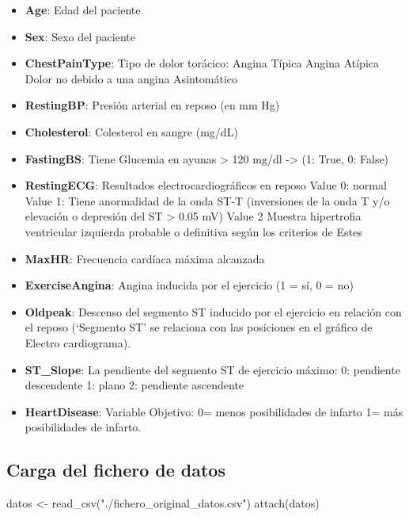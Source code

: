 \documentclass[
]{article}
\newenvironment{Shaded}{\begin{snugshade}}{\end{snugshade}}
\newcommand{\FunctionTok}[1]{\textcolor[rgb]{0.94,0.94,0.56}{#1}}
\newcommand{\NormalTok}[1]{\textcolor[rgb]{0.80,0.80,0.80}{#1}}
\newcommand{\OtherTok}[1]{\textcolor[rgb]{0.94,0.94,0.56}{#1}}
\newcommand{\StringTok}[1]{\textcolor[rgb]{0.80,0.58,0.58}{#1}}
\providecommand{\tightlist}{%
  \setlength{\itemsep}{0pt}\setlength{\parskip}{0pt}}
\begin{document}
\begin{itemize}
\tightlist
\item
  \textbf{Age}: Edad del paciente
\item
  \textbf{Sex}: Sexo del paciente
\item
  \textbf{ChestPainType}: Tipo de dolor torácico: Angina Típica Angina
  Atípica Dolor no debido a una angina Asintomático
\item
  \textbf{RestingBP}: Presión arterial en reposo (en mm Hg)
\item
  \textbf{Cholesterol}: Colesterol en sangre (mg/dL)
\item
  \textbf{FastingBS}: Tiene Glucemia en ayunas \textgreater{} 120 mg/dl
  -\textgreater{} (1: True, 0: False)
\item
  \textbf{RestingECG}: Resultados electrocardiográficos en reposo Value
  0: normal Value 1: Tiene anormalidad de la onda ST-T (inversiones de
  la onda T y/o elevación o depresión del ST \textgreater{} 0.05 mV)
  Value 2 Muestra hipertrofia ventricular izquierda probable o
  definitiva según los criterios de Estes
\item
  \textbf{MaxHR}: Frecuencia cardíaca máxima alcanzada
\item
  \textbf{ExerciseAngina}: Angina inducida por el ejercicio (1 = sí, 0 =
  no)
\item
  \textbf{Oldpeak}: Descenso del segmento ST inducido por el ejercicio
  en relación con el reposo (`Segmento ST' se relaciona con las
  posiciones en el gráfico de Electro cardiograma).
\item
  \textbf{ST\_Slope}: La pendiente del segmento ST de ejercicio máximo:
  0: pendiente descendente 1: plano 2: pendiente ascendente
\item
  \textbf{HeartDisease}: Variable Objetivo: 0= menos posibilidades de
  infarto 1= más posibilidades de infarto.
\end{itemize}

\hypertarget{carga-del-fichero-de-datos}{%
\subsection{Carga del fichero de
datos}\label{carga-del-fichero-de-datos}}

\begin{Shaded}
\begin{Highlighting}[]
\NormalTok{datos }\OtherTok{\textless{}{-}} \FunctionTok{read\_csv}\NormalTok{(}\StringTok{"./fichero\_original\_datos.csv"}\NormalTok{)}
\FunctionTok{attach}\NormalTok{(datos)}
\end{Highlighting}
\end{Shaded}
\end{document}
